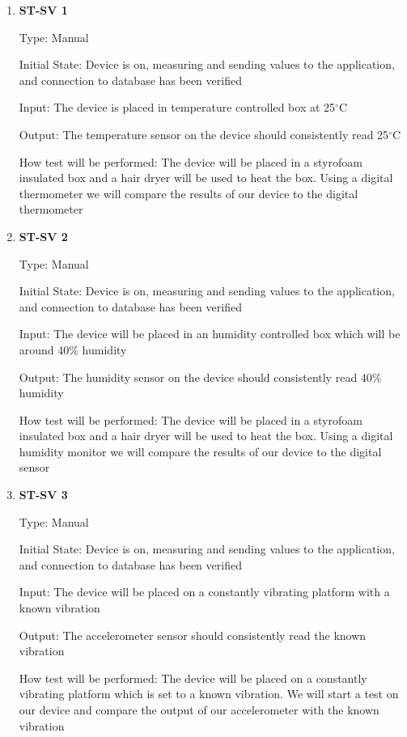 \documentclass[12pt, titlepage]{article}
\begin{document}
\begin{enumerate}

\item{\bf{ST-SV 1}}

Type: Manual
					
Initial State: Device is on, measuring and sending values to the application, and connection to database has been verified
					
Input: The device is placed in temperature controlled box at 25$^{\circ}$C
					
Output: The temperature sensor on the device should consistently read 25$^{\circ}$C

					
How test will be performed: The device will be placed in a styrofoam insulated box and a hair dryer will be used to heat the box. Using a digital thermometer we will compare the results of our device to the digital thermometer\\

		
\item{\bf{ST-SV 2}}

Type: Manual
					
Initial State: Device is on, measuring and sending values to the application, and connection to database has been verified
					
Input: The device will be placed in an humidity controlled box which will be around 40\% humidity
					
Output: The humidity sensor on the device should consistently read 40\% humidity

How test will be performed: The device will be placed in a styrofoam insulated box and a hair dryer will be used to heat the box. Using a digital humidity monitor we will compare the results of our device to the digital sensor

\item{\bf{ST-SV 3}}

Type: Manual
					
Initial State: Device is on, measuring and sending values to the application, and connection to database has been verified
					
Input: The device will be placed on a constantly vibrating platform with a known vibration
					
Output: The accelerometer sensor should consistently read the known vibration

How test will be performed: The device will be placed on a constantly vibrating platform which is set to a known vibration. We will start a test on our device and compare the output of our accelerometer with the known vibration

\end{enumerate}
\end{document}
